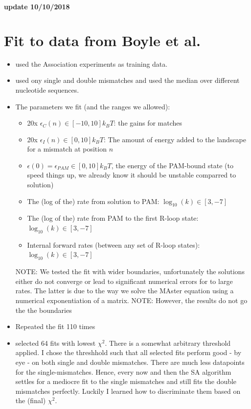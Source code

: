 \documentclass[a4paper,twoside]{revtex4-1}
\begin{document}
\begin{center}
{\bf \Large {update 10/10/2018}}
\end{center}


\section*{Fit to data from Boyle et al. }
\begin{itemize}
\item used the Association experiments as training data. 
\item used ony single and double mismatches and used the median over different nucleotide sequences. 
\item The parameters we fit (and the ranges we allowed):
	\begin{itemize}
	\item 20x $\epsilon_C(n) \in [-10, 10]k_BT$: the gains for matches 
	\item 20x $\epsilon_I(n) \in [0,10]k_BT$: The amount of energy added to the landscape for a mismatch at position $n$
	\item $\epsilon(0) = \epsilon_{PAM} \in [0, 10] k_BT$, the energy of the PAM-bound state (to speed things up, we already know it should be unstable comparred to solution) 
	\item The (log of the) rate from solution to PAM: $\log_{10}(k) \in [3,-7]$
	\item The (log of the) rate from PAM to the first R-loop state: $\log_{10}(k) \in [3,-7]$
	 \item Internal forward rates (between any set of R-loop states): $\log_{10}(k) \in [3,-7]$
	\end{itemize}
	NOTE: We tested the fit with wider boundaries, unfortunately the solutions either do not converge or lead to significant numerical errors for to large rates. The latter is due to the way we solve the MAster equation using a numerical exponentiation of a matrix.  
	NOTE: However, the results do not go the the boundaries	
\item Repeated the fit 110 times 
\item selected 64 fits with lowest $\chi^2$. There is a somewhat arbitrary threshold applied. I chose the threshhold such that all selected fits perform good - by eye - on both single and double mismatches. There are much less datapoints for the single-mismatches. Hence, every now and then the SA algorithm settles for a mediocre fit to the single mismatches and still fits the double mismatches perfectly. Luckily I learned how to discriminate them based on the (final) $\chi^2$. 


\end{itemize}
\end{document}
